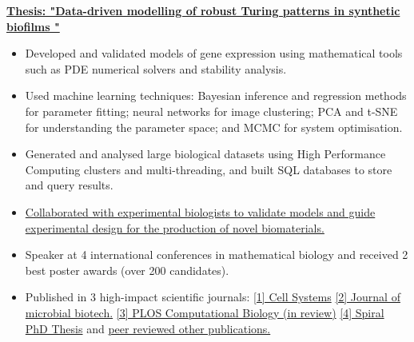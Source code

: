 \documentclass[10pt,a4paper,ragged2e,withhyper]{altacv}
\begin{document}
\begin{paracol}{2}

\href{https://doi.org/10.25560/111289}{\textbf{Thesis: "Data-driven modelling of robust Turing patterns in synthetic biofilms \faLink"}}
\begin{itemize}
\item Developed and validated models of gene expression using mathematical tools such as PDE numerical solvers and stability analysis. 

\item Used machine learning techniques: Bayesian inference and regression methods for parameter fitting; neural networks for image clustering; PCA and t-SNE for understanding the parameter space; and MCMC for system optimisation.

\item Generated and analysed large biological datasets using High Performance Computing clusters and multi-threading, and built SQL databases to store and query results.

\item \href{https://papers.ssrn.com/sol3/papers.cfm?abstract_id=4733248}{Collaborated with experimental biologists to validate models and guide experimental design for the production of novel biomaterials.}

\item Speaker at 4 international conferences in mathematical biology and received 2 best poster awards (over 200 candidates). 

\item Published in 3 high-impact scientific journals: \faLink \href{https://papers.ssrn.com/sol3/papers.cfm?abstract_id=4733248}{[1] Cell Systems}  
\href{https://doi.org/10.1111/1751-7915.13979}{[2] Journal of microbial biotech.} \href{https://www.biorxiv.org/content/10.1101/2024.09.09.611947v1}  {[3] PLOS Computational Biology (in review)} 
\href{https://doi.org/10.25560/111289}{[4] Spiral PhD Thesis} and \href{https://www.sciencedirect.com/science/article/pii/S2405471222004367}{peer reviewed other publications.} 


\end{itemize}
\vspace{-0.5\baselineskip} %


\end{paracol}
\end{document}
